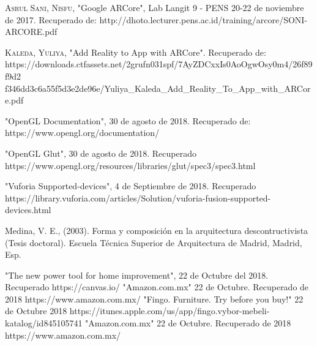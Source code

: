 \begin{thebibliography}{X}
	
	 \textsc{Asrul Sani, Nisfu}, "Google ARCore", Lab Langit 9 - PENS 20-22 de noviembre de 2017. Recuperado de: http://dhoto.lecturer.pens.ac.id/training/arcore/SONI-ARCORE.pdf
	
	 \textsc{Kaleda, Yuliya}, "Add Reality to App with ARCore". Recuperado de: https://downloads.ctfassets.net/2grufn031spf/7AyZDCxxIs0AoOgwOsy0m4/26f89f9d2
	f346dd3c6a55f5d3e2de96e/Yuliya\_Kaleda\_Add\_Reality\_To\_App\_with\_ARCore.pdf
	

	
	
	
	 "OpenGL Documentation", 30 de agosto de 2018. Recuperado de:
	https://www.opengl.org/documentation/
	
	 "OpenGL Glut", 30 de agosto de 2018. Recuperado
	https://www.opengl.org/resources/libraries/glut/spec3/spec3.html
	
    
	
	 "Vuforia Supported-devices", 4 de Septiembre de 2018. Recuperado
	https://library.vuforia.com/articles/Solution/vuforia-fusion-supported-devices.html
	
	 Medina, V. E., (2003). Forma y composición en la arquitectura descontructivista (Tesis doctoral). Escuela Técnica Superior de Arquitectura de Madrid, Madrid, Esp.
	
	
	 "The new power tool for home improvement", 22 de Octubre del 2018. Recuperado https://canvas.io/
	 "Amazon.com.mx" 22 de Octubre. Recuperado  de  2018 https://www.amazon.com.mx/ 
	 "Fingo. Furniture. Try before you buy!" 22 de Octubre 2018 https://itunes.apple.com/us/app/fingo.vybor-mebeli-katalog/id845105741
	 "Amazon.com.mx" 22 de Octubre. Recuperado  de  2018 https://www.amazon.com.mx/ 
	
	
\end{thebibliography}
